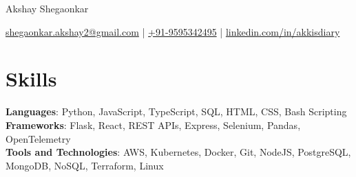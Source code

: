 \documentclass[11pt]{article}       %
\begin{document}
\centerline{\Huge Akshay Shegaonkar}

\vspace{5pt}

\centerline{\href{mailto:shegaonkar.akshay2@gmail.com}{shegaonkar.akshay2@gmail.com} | \href{tel:+919595342495}{+91-9595342495} | \href{https://www.linkedin.com/in/akkisdiary}{linkedin.com/in/akkisdiary}}

\vspace{-10pt}

\section*{Skills}
\textbf{Languages}: Python, JavaScript, TypeScript, SQL, HTML, CSS, Bash Scripting \\
\textbf{Frameworks}: Flask, React, REST APIs, Express, Selenium, Pandas, OpenTelemetry \\
\textbf{Tools and Technologies}: AWS, Kubernetes, Docker, Git, NodeJS, PostgreSQL, MongoDB, NoSQL, Terraform, Linux \\
\vspace{-6.5pt}

\end{document}
